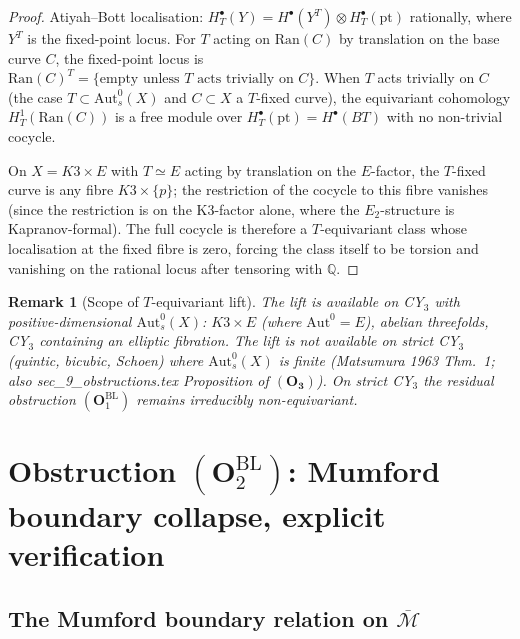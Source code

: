 \documentclass[11pt]{amsart}
\newtheorem{remark}[theorem]{Remark}
\newcommand{\Ran}{\mathrm{Ran}}
\newcommand{\Mbar}{\overline{\mathcal{M}}}
\newcommand{\bQ}{\mathbb{Q}}
\newcommand{\Aut}{\mathrm{Aut}}
\begin{document}
\begin{proof}
Atiyah--Bott localisation: $H^\bullet_T(Y) = H^\bullet(Y^T) \otimes
H^\bullet_T(\mathrm{pt})$ rationally, where $Y^T$ is the fixed-point
locus. For $T$ acting on $\Ran(C)$ by translation on the base curve
$C$, the fixed-point locus is $\Ran(C)^T = \{\text{empty unless } T
\text{ acts trivially on }C\}$. When $T$ acts trivially on $C$ (the
case $T \subset \Aut^0_s(X)$ and $C \subset X$ a $T$-fixed curve),
the equivariant cohomology $H^1_T(\Ran(C))$ is a free module over
$H^\bullet_T(\mathrm{pt}) = H^\bullet(BT)$ with no non-trivial
cocycle.

On $X = K3 \times E$ with $T \simeq E$ acting by translation on the
$E$-factor, the $T$-fixed curve is any fibre $K3 \times \{p\}$; the
restriction of the cocycle to this fibre vanishes (since the
restriction is on the K3-factor alone, where the $E_2$-structure is
Kapranov-formal). The full cocycle is therefore a $T$-equivariant
class whose localisation at the fixed fibre is zero, forcing the
class itself to be torsion and vanishing on the rational locus
after tensoring with $\bQ$.
\end{proof}

\begin{remark}[Scope of $T$-equivariant lift]
The lift is available on CY$_3$ with positive-dimensional
$\Aut^0_s(X)$: $K3 \times E$ (where $\Aut^0 = E$), abelian
threefolds, CY$_3$ containing an elliptic fibration. The lift is
\emph{not} available on strict CY$_3$ (quintic, bicubic, Schoen)
where $\Aut^0_s(X)$ is finite (Matsumura 1963 Thm.~1; also
sec\_9\_obstructions.tex Proposition of $(\mathbf{O_3})$). On
strict CY$_3$ the residual obstruction $(\mathbf{O}_1^{\mathrm{BL}})$
remains irreducibly non-equivariant.
\end{remark}

\section{Obstruction $(\mathbf{O}_2^{\mathrm{BL}})$: Mumford boundary
collapse, explicit verification}
\label{sec:O2-mumford-collapse}

\subsection{The Mumford boundary relation on $\Mbar$}
\end{document}
